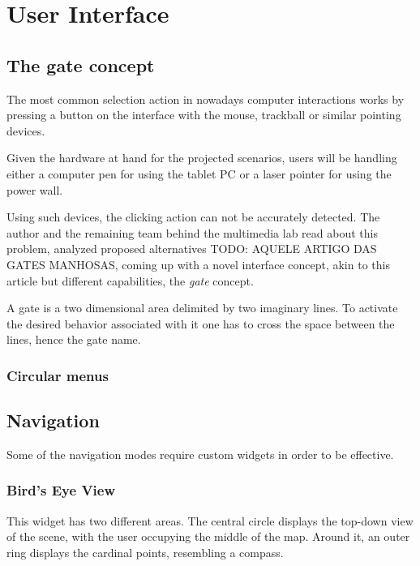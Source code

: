 

\section{User Interface}

\subsection{The gate concept}

The most common selection action in nowadays computer interactions works by
pressing a button on the interface with the mouse, trackball or similar pointing devices.

Given the hardware at hand for the projected scenarios,
users will be handling either a computer pen for using the tablet PC or a laser pointer for using the power wall.

Using such devices, the clicking action can not be accurately detected.
The author and the remaining team behind the multimedia lab read about this problem,
analyzed proposed alternatives {TODO: AQUELE ARTIGO DAS GATES MANHOSAS},
coming up with a novel interface concept, akin to this article but different capabilities, the \emph{gate} concept.

A gate is a two dimensional area delimited by two imaginary lines. To activate the desired behavior associated
with it one has to cross the space between the lines, hence the gate name.


\subsubsection{Circular menus}


\subsection{Navigation}

Some of the navigation modes require custom widgets in order to be effective.

\subsubsection{Bird's Eye View}

This widget has two different areas.
The central circle displays the top-down view of the scene, with the user occupying the middle of the map.
Around it, an outer ring displays the cardinal points, resembling a compass.

